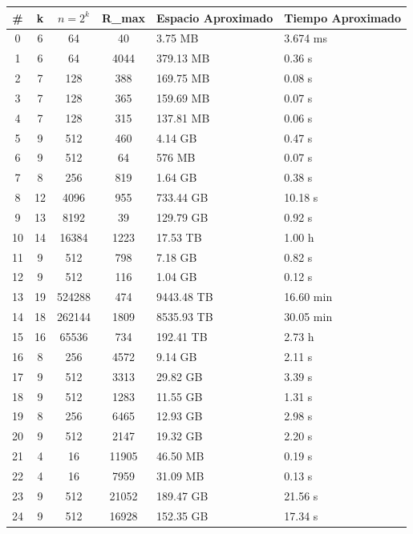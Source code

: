 \documentclass[11pt,letter]{article}
\begin{document}
\begin{itemize}
\begin{table}[H]
    \centering
    \small
\begin{tabular}{|c|c|c|c|l|l|}
\hline
\# & k & $n=2^k$ & R\_max & Espacio Aproximado & Tiempo Aproximado\\
\hline
0  & 6  & 64      & 40     & 3.75 MB        & 3.674 ms \\
1  & 6  & 64      & 4044   & 379.13 MB      & 0.36 s \\
2  & 7  & 128     & 388    & 169.75 MB      & 0.08 s \\
3  & 7  & 128     & 365    & 159.69 MB      & 0.07 s \\
4  & 7  & 128     & 315    & 137.81 MB      & 0.06 s \\
5  & 9  & 512     & 460    & 4.14 GB        & 0.47 s \\
6  & 9  & 512     & 64     & 576 MB         & 0.07 s \\
7  & 8  & 256     & 819    & 1.64 GB        & 0.38 s \\
8  & 12 & 4096    & 955    & 733.44 GB      & 10.18 s \\
9  & 13 & 8192    & 39     & 129.79 GB      & 0.92 s \\
10 & 14 & 16384   & 1223   & 17.53 TB       & 1.00 h \\
11 & 9  & 512     & 798    & 7.18 GB        & 0.82 s \\
12 & 9  & 512     & 116    & 1.04 GB        & 0.12 s \\
13 & 19 & 524288  & 474    & 9443.48 TB     & 16.60 min \\
14 & 18 & 262144  & 1809   & 8535.93 TB     & 30.05 min \\
15 & 16 & 65536   & 734    & 192.41 TB      & 2.73 h \\
16 & 8  & 256     & 4572   & 9.14 GB        & 2.11 s \\
17 & 9  & 512     & 3313   & 29.82 GB       & 3.39 s \\
18 & 9  & 512     & 1283   & 11.55 GB       & 1.31 s \\
19 & 8  & 256     & 6465   & 12.93 GB       & 2.98 s \\
20 & 9  & 512     & 2147   & 19.32 GB       & 2.20 s \\
21 & 4  & 16      & 11905  & 46.50 MB       & 0.19 s \\
22 & 4  & 16      & 7959   & 31.09 MB       & 0.13 s \\
23 & 9  & 512     & 21052  & 189.47 GB      & 21.56 s \\
24 & 9  & 512     & 16928  & 152.35 GB      & 17.34 s \\

\end{tabular}
\end{table}
\end{itemize}
\end{document}
